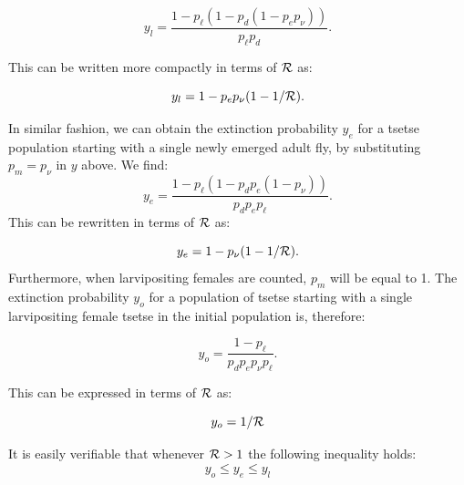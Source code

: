 \documentclass[smallextended]{svjour3}
\begin{document}
	$$y_l = \frac{1-p_{\ell}(1 - p_{d}(1 - p_{e}p_{\nu}))}{p_{\ell}p_{d}}.$$
	
	This can be written more compactly in terms of ${\cal R}$ as:
	
	\begin{equation}
		\label{larvExtinction}
		y_l = 1 - p_ep_{\nu}(1-1/{\cal R}).
	\end{equation}
	
	In similar fashion, we can obtain the extinction probability $y_e$ for a tsetse population starting with a single newly emerged adult fly, by substituting  $p_m = p_{\nu}$ in $y$ above.
	We find:
	$$ y_e=\frac{1- p_{\ell}(1 -p_{d}p_{e}(1- p_{\nu}))}{p_{d}p_{e}p_{\ell}}. $$ This can be rewritten in terms of ${\cal R}$ as:
	
	\begin{equation}
		\label{emergeExtinction}
		y_e = 1 - p_{\nu}(1-1/{\cal R}).	
	\end{equation}
	Furthermore, when  larvipositing females are counted, $p_m$ will be equal to 1. The extinction probability $y_o$ for a population of tsetse starting with a single larvipositing female tsetse in the initial population is, therefore:
	
	$$y_o = \frac{1-p_{\ell}}{p_{d}p_{e}p_{\nu}p_{\ell}}.$$
	
	This can be expressed in terms of ${\cal R}$ as:
	
	\begin{equation}
		\label{matureExtinction}
		y_o = 1/{\cal R}	
	\end{equation}
	
	It is easily verifiable that whenever ${\cal R}>1$ the following inequality holds:
	\begin{equation}
		\label{Aretsetsetheorem}
		y_{o}\leq y_{e} \leq y_{l}
	\end{equation} 
	
	
\end{document}

